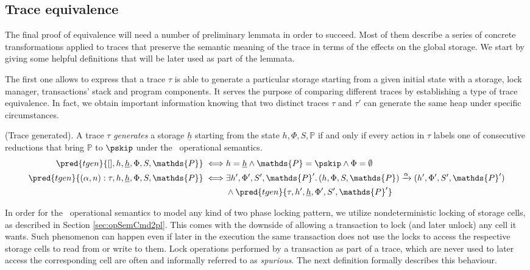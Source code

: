 \tocless\subsection{Trace equivalence}

The final proof of equivalence will need a number of preliminary lemmata in order to succeed. Most of them describe a series of concrete transformations applied to traces that preserve the semantic meaning of the trace in terms of the effects on the global storage. We start by giving some helpful definitions that will be later used as part of the lemmata.

The first one allows to express that a trace $\tau$ is able to generate a particular storage starting from a given initial state with a storage, lock manager, transactions' stack and program components. It serves the purpose of comparing different traces by establishing a type of trace equivalence. In fact, we obtain important information knowing that two distinct traces $\tau$ and $\tau'$ can generate the same heap under specific circumstances.

\begin{defn}
	(Trace generated).
	A trace $\tau$ \emph{generates} a storage $\underline{h}$ starting from the state $h, \Phi, S, \mathds{P}$ if and only if every action in $\tau$ labels one of consecutive reductions that bring $\mathds{P}$ to $\pskip$ under the \tpl\ operational semantics.
	\begin{align*}
		\pred{tgen}{[], h, \underline{h}, \Phi, S, \mathds{P}}
			\iff&
		h = \underline{h} \land \mathds{P} = \pskip \land \Phi = \emptyset
			\\
		\pred{tgen}{(\alpha, n) : \tau, h, \underline{h}, \Phi, S, \mathds{P}}
			\iff&
		\exists h', \Phi', S', \mathds{P}' \ldotp (h, \Phi, S, \mathds{P}) \xrightarrow{\alpha} (h', \Phi', S', \mathds{P}') \\ &\land \pred{tgen}{\tau, h', \underline{h}, \Phi', S', \mathds{P}'}
	\end{align*}
\end{defn}

In order for the \tpl\ operational semantics to model any kind of two phase locking pattern, we utilize nondeterministic locking of storage cells, as described in Section \ref{sec:opSemCmd2pl}. This comes with the downside of allowing a transaction to lock (and later unlock) any cell it wants. Such phenomenon can happen even if later in the execution the same transaction does not use the locks to access the respective storage cells to read from or write to them. Lock operations performed by a transaction as part of a trace, which are never used to later access the corresponding cell are often and informally referred to as \textit{spurious}. The next definition formally describes this behaviour.

